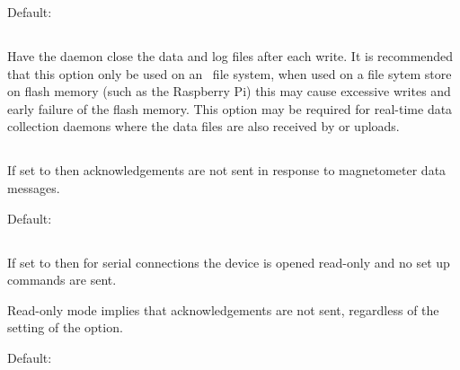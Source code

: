 Default: 

\subsection{}
Have the daemon close the data and log files after each write. It is
recommended that this option only be used on an \nfs\ file system,
when used on a file sytem store on flash memory (such as the Raspberry
Pi) this may cause excessive writes and early failure of the flash
memory. This option may be required for real-time data collection
daemons where the data files are also received by  or
 uploads.

\subsection{}
If set to  then acknowledgements are not sent in response
to magnetometer data messages.

Default: 

\subsection{}
If set to  then for serial connections the device is opened
read-only and no set up commands are sent.

Read-only mode implies that acknowledgements are not sent, regardless
of the setting of the  option.

Default: 


